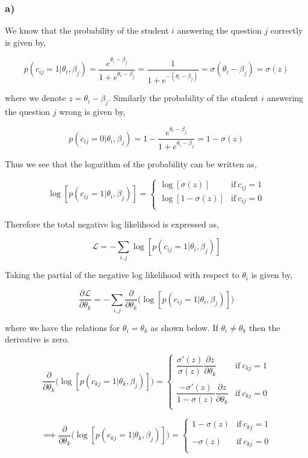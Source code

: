 \documentclass{article}
\begin{document}
\subsubsection*{a)}
We know that the probability of the student $i$ answering the question $j$ correctly is given by,

$$p(c_{ij}=1|\theta_i, \beta_j)=\dfrac{e^{\theta_i-\beta_j}}{1+e^{\theta_i- \beta_j}}= \dfrac{1}{1+e^{-(\theta_i- \beta_j)}}=\sigma(\theta_i- \beta_j)=\sigma(z)$$

where we denote $z= \theta_i- \beta_j$. Similarly the probability of the student $i$ answering the question $j$ wrong is given by,

$$p(c_{ij}=0|\theta_i, \beta_j)=1-\dfrac{e^{\theta_i-\beta_j}}{1+e^{\theta_i- \beta_j}}=1-\sigma(z)$$

Thus we see that the logarithm of the probability can be written as,

$$\log[p(c_{ij}=1|\theta_i, \beta_j)]=
\begin{cases}
\log[\sigma(z)] &\text{if}\ c_{ij}=1\\
\log[1-\sigma(z)] &\text{if}\ c_{ij}=0\\
\end{cases}$$

Therefore the total negative log likelihood is expressed as,

$$\mathcal{L}= -\sum_{i,j}\log[p(c_{ij}=1|\theta_i, \beta_j)]$$

Taking the partial of the negative log likelihood with respect to $\theta_i$ is given by,

$$\dfrac{\partial \mathcal{L}}{\partial \theta_k}= -\sum_{i,j}\dfrac{\partial}{\partial \theta_k}\Big(\log[p(c_{ij}=1|\theta_i, \beta_j)]\Big)$$

where we have the relations for $\theta_i=\theta_k$ as shown below. If $\theta_i\neq \theta_k$ then the derivative is zero.

$$\dfrac{\partial}{\partial \theta_k}\Big(\log[p(c_{kj}=1|\theta_k, \beta_j)]\Big)=
\begin{cases}
\dfrac{\sigma'(z)}{\sigma(z)}\dfrac{\partial z}{\partial \theta_k} &\text{if}\ c_{kj}=1\\
\\
\dfrac{-\sigma'(z)}{1-\sigma(z)}\dfrac{\partial z}{\partial \theta_k} &\text{if}\ c_{kj}=0\\
\end{cases}$$

$$\implies \dfrac{\partial}{\partial \theta_k}\Big(\log[p(c_{kj}=1|\theta_k, \beta_j)]\Big)=
\begin{cases}
1-\sigma(z) &\text{if}\ c_{kj}=1\\
\\
-\sigma(z) &\text{if}\ c_{kj}=0\\
\end{cases}$$
\end{document}
